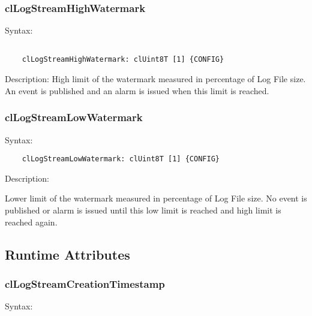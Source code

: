 \begin{flushleft}
\subsubsection{clLogStreamHighWatermark}
\begin{Desc}
\item[Syntax:]
\footnotesize\begin{verbatim}        	

	clLogStreamHighWatermark: clUint8T [1] {CONFIG}
	\end{verbatim}
	\normalsize
\end{Desc}

\begin{Desc}
 \item[Description:]
High limit of the watermark measured in percentage of Log File size. An event is published and an alarm is issued when this limit is reached.
\end{Desc}

\subsubsection{clLogStreamLowWatermark}
\begin{Desc}
\item[Syntax:]
\footnotesize\begin{verbatim}        	
	clLogStreamLowWatermark: clUint8T [1] {CONFIG}
	\end{verbatim}
	\normalsize
\end{Desc}

\begin{Desc}
 \item[Description:]
\end{Desc}
Lower limit of the watermark measured in percentage of Log File size. No event
is published or alarm is issued until this low limit is reached and high limit is reached again.



\subsection{Runtime Attributes}
\subsubsection{clLogStreamCreationTimestamp}
\begin{Desc}
\item[Syntax:]
\footnotesize\begin{verbatim}        	


\end{verbatim}
\end{Desc}
\end{flushleft}

